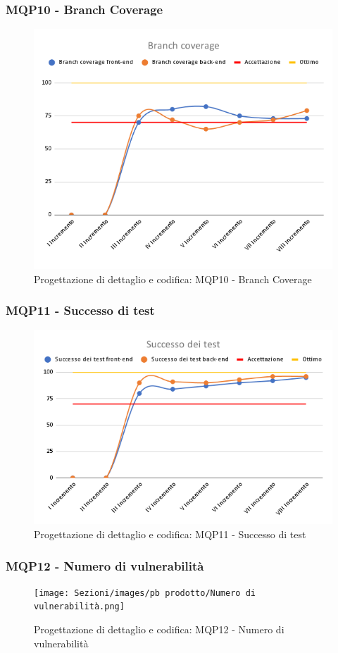 \subsubsection{MQP10 - Branch Coverage}
\begin{figure}[H]
    \centering
    \includegraphics[scale=0.50]{Sezioni/images/pb prodotto/Branch coverage .png}
    \caption{Progettazione di dettaglio e codifica: MQP10 - Branch Coverage}
\end{figure}
\subsubsection{MQP11 - Successo di test}
\begin{figure}[H]
    \centering
    \includegraphics[scale=0.50]{Sezioni/images/pb prodotto/Successo dei test.png}
    \caption{Progettazione di dettaglio e codifica: MQP11 - Successo di test}
\end{figure}
\subsubsection{MQP12 - Numero di vulnerabilità}
\begin{figure}[H]
    \centering
    \texttt{[image: Sezioni/images/pb prodotto/Numero di vulnerabilità.png]}
    \caption{Progettazione di dettaglio e codifica: MQP12 - Numero di vulnerabilità}
\end{figure}
